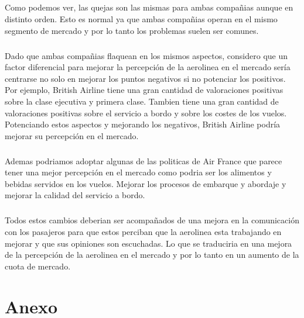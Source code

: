 \documentclass{report}
\begin{document}
{            \paragraph*{}
            {
                Como podemos ver, las quejas son las mismas para ambas compañias aunque en distinto orden.
                Esto es normal ya que ambas compañias operan en el mismo segmento de mercado y por lo tanto los problemas suelen ser comunes.
            }
            \paragraph*{}
            {
                Dado que ambas compañias flaquean en los mismos aspectos, considero que un factor diferencial para mejorar la percepción de la aerolinea en el mercado sería centrarse no solo en mejorar los puntos negativos si no potenciar los positivos.
                Por ejemplo, British Airline tiene una gran cantidad de valoraciones positivas sobre la clase ejecutiva y primera clase. 
                Tambien tiene una gran cantidad de valoraciones positivas sobre el servicio a bordo y sobre los costes de los vuelos.
                Potenciando estos aspectos y mejorando los negativos, British Airline podría mejorar su percepción en el mercado.
            }
            \paragraph*{}
            {
                Ademas podriamos adoptar algunas de las politicas de Air France que parece tener una mejor percepción en el mercado como podria ser los alimentos y bebidas servidos en los vuelos.
                Mejorar los procesos de embarque y abordaje y mejorar la calidad del servicio a bordo.
            }
            \paragraph*{}
            {
                Todos estos cambios deberian ser acompañados de una mejora en la comunicación con los pasajeros para que estos perciban que la aerolinea esta trabajando en mejorar y que sus opiniones son escuchadas.
                Lo que se traduciria en una mejora de la percepción de la aerolinea en el mercado y por lo tanto en un aumento de la cuota de mercado.
            }
    \chapter{Anexo}
}
\end{document}

